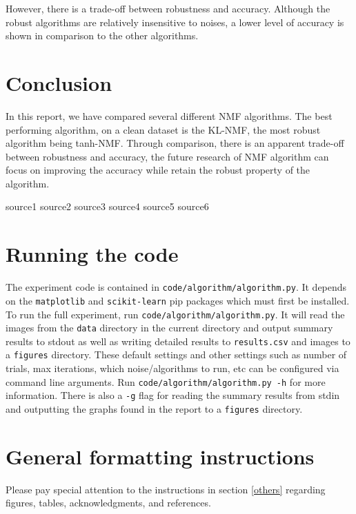 \documentclass{article} %
\begin{document}
However, there is a trade-off between robustness and accuracy. Although the robust algorithms are relatively insensitive to noises, a lower level of accuracy is shown in comparison to the other algorithms. 

\section{Conclusion}
In this report, we have compared several different NMF algorithms. The best performing algorithm, on a clean dataset is the KL-NMF, the most robust algorithm being tanh-NMF. Through comparison, there is an apparent trade-off between robustness and accuracy, the future research of NMF algorithm can focus on improving the accuracy while retain the robust property of the algorithm. 


\begin{thebibliography}{9}
 source1
 source2
 source3
 source4
 source5
 source6
\end{thebibliography}

\appendix

\section{Running the code}
The experiment code is contained in \texttt{code/algorithm/algorithm.py}. It depends on the \texttt{matplotlib} and \texttt{scikit-learn} pip packages which must first be installed. To run the full experiment, run \texttt{code/algorithm/algorithm.py}. It will read the images from the \texttt{data} directory in the current directory and output summary results to stdout as well as writing detailed results to \texttt{results.csv} and images to a \texttt{figures} directory. These default settings and other settings such as number of trials, max iterations, which noise/algorithms to run, etc can be configured via command line arguments. Run \texttt{code/algorithm/algorithm.py -h} for more information. There is also a \texttt{-g} flag for reading the summary results from stdin and outputting the graphs found in the report to a \texttt{figures} directory.

\section{General formatting instructions}
\label{gen_inst}

Please pay special attention to the instructions in section \ref{others}
regarding figures, tables, acknowledgments, and references.
\end{document}
